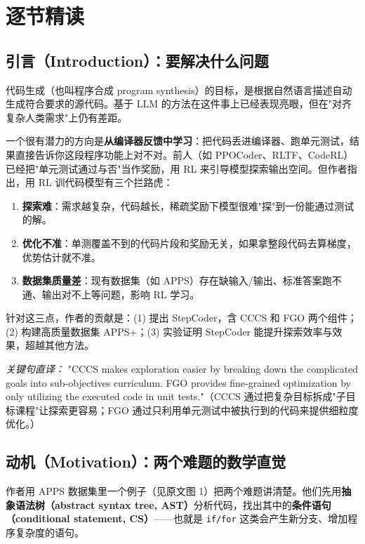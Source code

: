 \documentclass[11pt,UTF8,fontset=fandol]{ctexart}
\begin{document}
\section{逐节精读}

\subsection{引言（Introduction）：要解决什么问题}

代码生成（也叫程序合成 program synthesis）的目标，是根据自然语言描述自动生成符合要求的源代码。基于 LLM 的方法在这件事上已经表现亮眼，但在"对齐复杂人类需求"上仍有差距。

一个很有潜力的方向是\textbf{从编译器反馈中学习}：把代码丢进编译器、跑单元测试，结果直接告诉你这段程序功能上对不对。前人（如 PPOCoder、RLTF、CodeRL）已经把"单元测试通过与否"当作奖励，用 RL 来引导模型探索输出空间。但作者指出，用 RL 训代码模型有三个拦路虎：

\begin{enumerate}[leftmargin=2em]
\item \textbf{探索难}：需求越复杂，代码越长，稀疏奖励下模型很难"探"到一份能通过测试的解。
\item \textbf{优化不准}：单测覆盖不到的代码片段和奖励无关，如果拿整段代码去算梯度，优势估计就不准。
\item \textbf{数据集质量差}：现有数据集（如 APPS）存在缺输入/输出、标准答案跑不通、输出对不上等问题，影响 RL 学习。
\end{enumerate}

针对这三点，作者的贡献是：(1) 提出 StepCoder，含 CCCS 和 FGO 两个组件；(2) 构建高质量数据集 APPS+；(3) 实验证明 StepCoder 能提升探索效率与效果，超越其他方法。

\textit{关键句直译：} "CCCS makes exploration easier by breaking down the complicated goals into sub-objectives curriculum. FGO provides fine-grained optimization by only utilizing the executed code in unit tests."（CCCS 通过把复杂目标拆成"子目标课程"让探索更容易；FGO 通过只利用单元测试中被执行到的代码来提供细粒度优化。）

\subsection{动机（Motivation）：两个难题的数学直觉}

作者用 APPS 数据集里一个例子（见原文图 1）把两个难题讲清楚。他们先用\textbf{抽象语法树（abstract syntax tree, AST）}分析代码，找出其中的\textbf{条件语句（conditional statement, CS）}——也就是 \texttt{if/for} 这类会产生新分支、增加程序复杂度的语句。
\end{document}

